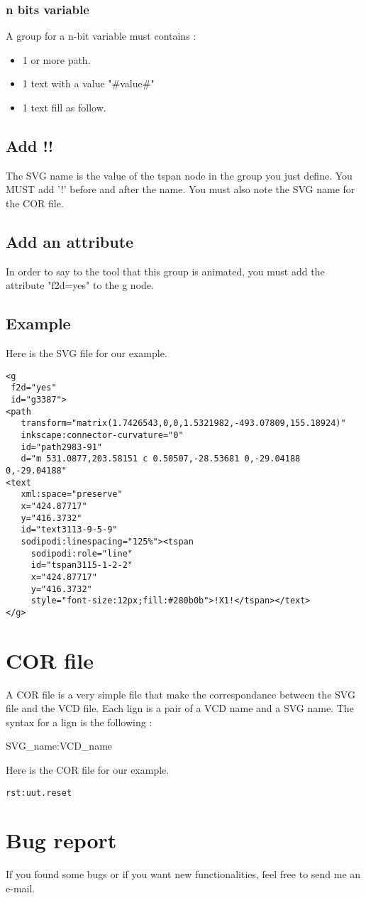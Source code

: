 \documentclass{article}
\begin{document}
\subsubsection{n bits variable}
A group for a n-bit variable must contains : 
\begin{itemize}
\item 1 or more path.
\item 1 text with a value "\#value\#"
\item 1 text fill as follow.
\end{itemize}
\subsection{Add !!}
The SVG name is  the value of the tspan node in the group you just define. You MUST add '!' before and after the name. You must also note the SVG name for
the COR file.
\subsection{Add an attribute}
In order to say to the tool that this group is animated, you must add the attribute "f2d=yes" to the g node.
\subsection{Example}
Here is the SVG file for our example.
\begin{lstlisting}
<g
 f2d="yes"
 id="g3387">
<path
   transform="matrix(1.7426543,0,0,1.5321982,-493.07809,155.18924)"
   inkscape:connector-curvature="0"
   id="path2983-91"
   d="m 531.0877,203.58151 c 0.50507,-28.53681 0,-29.04188 0,-29.04188"
<text
   xml:space="preserve"
   x="424.87717"
   y="416.3732"
   id="text3113-9-5-9"
   sodipodi:linespacing="125%"><tspan
	 sodipodi:role="line"
	 id="tspan3115-1-2-2"
	 x="424.87717"
	 y="416.3732"
	 style="font-size:12px;fill:#280b0b">!X1!</tspan></text>
</g>
\end{lstlisting}

\section{COR file}
A COR file is a very simple file that make the correspondance between the SVG file and the VCD file. Each lign is a pair of a VCD name and a SVG name. The syntax for
a lign is the following :
\begin{center}
SVG\_name:VCD\_name
\end{center}
Here is the COR file for our example.
\begin{lstlisting}
rst:uut.reset
\end{lstlisting}

\section{Bug report}
If you found some bugs or if you want new functionalities, feel free to send me an e-mail. 
\end{document}
